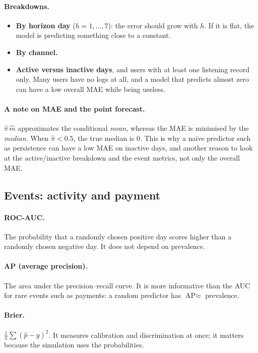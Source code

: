 \documentclass[11pt]{article}
\begin{document}
\paragraph{Breakdowns.}
\begin{itemize}
  \item \textbf{By horizon day} ($h = 1, \dots, 7$): the error should grow with $h$. If it is flat, the model is predicting something close to a constant.
  \item \textbf{By channel.}
  \item \textbf{Active versus inactive days}, and users with at least one listening record only. Many users have no logs at all, and a model that predicts almost zero can have a low overall MAE while being useless.
\end{itemize}

\paragraph{A note on MAE and the point forecast.} $\hat\pi\,\hat m$ approximates the conditional \emph{mean}, whereas the MAE is minimised by the \emph{median}. When $\hat\pi < 0.5$, the true median is 0. This is why a naive predictor such as persistence can have a low MAE on inactive days, and another reason to look at the active/inactive breakdown and the event metrics, not only the overall MAE.

\subsection{Events: activity and payment}

\paragraph{ROC-AUC.} The probability that a randomly chosen positive day scores higher than a randomly chosen negative day. It does not depend on prevalence.

\paragraph{AP (average precision).} The area under the precision--recall curve. It is more informative than the AUC for rare events such as payments: a random predictor has $\text{AP} \approx$ prevalence.

\paragraph{Brier.} $\frac{1}{n}\sum (\hat p - y)^2$. It measures calibration and discrimination at once; it matters because the simulation uses the probabilities.
\end{document}
